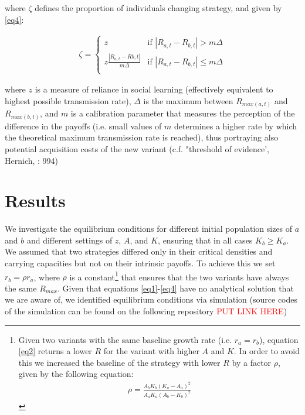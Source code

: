 \documentclass[review,authoryear]{elsarticle}
\begin{document}
where $\zeta$ defines the proportion of individuals changing strategy, and given by \eqref{eq4}:

\begin{equation}
\begin{aligned}
\label{eq4}
\zeta = 
\begin{cases}
z& \text{if }|R_{a,t}-R_{b,t}| > m\Delta\\
z\frac{|R_{a,t}-R{b,t}|}{m\Delta}& \text{if }|R_{a,t}-R_{b,t}| \leq m\Delta\\
\end{cases}
\end{aligned}
\end{equation}

where $z$ is a measure of reliance in social learning (effectively equivalent to highest possible transmission rate), $\Delta$ is the maximum between $R_{max(a,t)}$ and $R_{max(b,t)}$, and $m$ is a calibration parameter that measures the perception of the difference in the payoffs (i.e. small values of $m$ determines a higher rate by which the theoretical maximum transmission rate is reached), thus portraying also potential acquisition costs of the new variant (c.f. "threshold of evidence', Hernich, \citeyear{henrich2001cultural}: 994)

\section{Results}

We investigate the equilibrium conditions for different initial population sizes of $a$ and $b$ and different settings of $z$, $A$, and $K$, ensuring that in all cases $K_b \geq K_a$. We assumed that two strategies differed only in their critical densities and carrying capacities but not on their intrinsic payoffs. To achieve this we set $r_b=\rho r_a$, where $\rho$ is a constant\footnote{Given two variants with the same baseline growth rate (i.e. $r_a=r_b$), equation \eqref{eq2} returns a lower $R$ for the variant with higher $A$ and $K$. In order to avoid this we increased the baseline of the strategy with lower $R$ by a factor $\rho$, given by the following equation:
\begin{align*}
\rho=\frac{A_bK_b(K_a-A_a)^2}{A_aK_a(A_b-K_b)^2}
\end{align*}
  } 
that ensures that the two variants have always the same $R_{max}$. Given that equations \ref{eq1}-\ref{eq4} have no analytical solution that we are aware of, we identified equilibrium conditions via simulation (source codes of the simulation can be found on the following repository \textcolor{red}{PUT LINK HERE})
\end{document}
